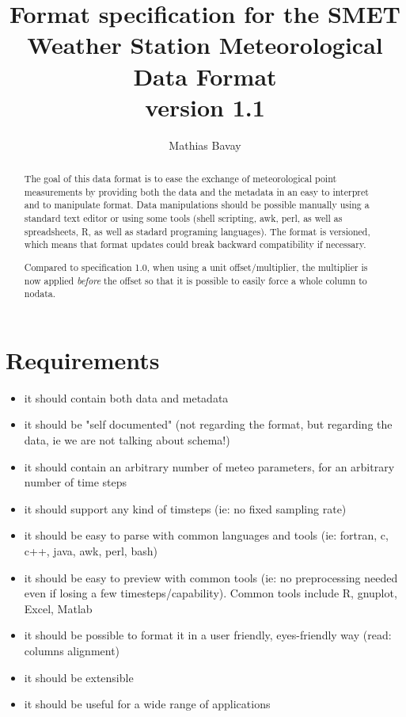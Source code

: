\documentclass[a4paper,10pt]{article}
\title{Format specification for the SMET Weather Station Meteorological Data Format\\version 1.1}
\author{Mathias Bavay}
\begin{document}
\maketitle

\begin{abstract}
The goal of this data format is to ease the exchange of meteorological point measurements by providing both the data and the metadata in an easy to interpret and to manipulate format. Data manipulations should be possible manually using a standard text editor or using some tools (shell scripting, awk, perl, as well as spreadsheets, R, as well as stadard programing languages). The format is versioned, which means that format updates could break backward compatibility if necessary.

Compared to specification 1.0, when using a unit offset/multiplier, the multiplier is now applied \emph{before} the offset so that it is possible to easily force a whole column to nodata.
\end{abstract}

\section{Requirements}
\begin{itemize}
	\item it should contain both data and metadata
	\item it should be "self documented" (not regarding the format, but
	regarding the data, ie we are not talking about schema!)
	\item it should contain an arbitrary number of meteo parameters, for an
	arbitrary number of time steps
	\item it should support any kind of timsteps (ie: no fixed sampling rate)
	\item it should be easy to parse with common languages and tools (ie:
	fortran, c, c++, java, awk, perl, bash)
	\item it should be easy to preview with common tools (ie: no
	preprocessing needed even if losing a few timesteps/capability). Common
	tools include R, gnuplot, Excel, Matlab
	\item it should be possible to format it in a user friendly,
	eyes-friendly way (read: columns alignment)
	\item it should be extensible
	\item it should be useful for a wide range of applications
\end{itemize}
\end{document}
